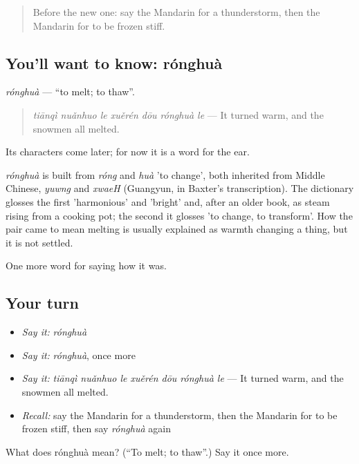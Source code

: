 \label{lesson:ZH-C514-ronghua}



\begin{quote}
Before the new one: say the Mandarin for a thunderstorm, then the Mandarin for to be frozen stiff.
\end{quote}

\subsection*{You'll want to know: rónghuà}
\emph{rónghuà} — \textquotedblleft{}to melt; to thaw\textquotedblright{}.

\begin{quote}
\emph{tiānqì nuǎnhuo le xuěrén dōu rónghuà le} — It turned warm, and the snowmen all melted.
\end{quote}

Its characters come later; for now it is a word for the ear.

\begin{cousinweb}
\emph{rónghuà} is built from \emph{róng} and \emph{huà} 'to change', both inherited from Middle Chinese, \emph{yuwng} and \emph{xwaeH} (Guangyun, in Baxter's transcription). The dictionary glosses the first 'harmonious' and 'bright' and, after an older book, as steam rising from a cooking pot; the second it glosses 'to change, to transform'. How the pair came to mean melting is usually explained as warmth changing a thing, but it is not settled.
\end{cousinweb}

\begin{grammarlens}[title={What you've built}]
One more word for saying how it was.
\end{grammarlens}

\subsection*{Your turn}
\begin{itemize}
\raggedright
  \item \emph{Say it:} \emph{rónghuà}
  \item \emph{Say it:} \emph{rónghuà}, once more
  \item \emph{Say it:} \emph{tiānqì nuǎnhuo le xuěrén dōu rónghuà le} — It turned warm, and the snowmen all melted.
  \item \emph{Recall:} say the Mandarin for a thunderstorm, then the Mandarin for to be frozen stiff, then say \emph{rónghuà} again
\end{itemize}

\begin{tcolorbox}[breakable,colback=teal!4,colframe=teal!35!black,title={Before you move on}]
What does rónghuà mean? (\textquotedblleft{}To melt; to thaw\textquotedblright{}.) Say it once more.
\end{tcolorbox}
